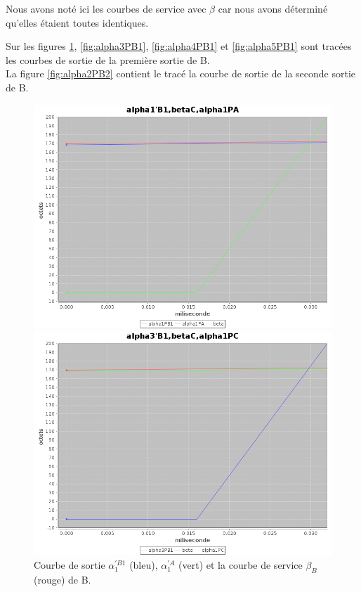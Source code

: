 Nous avons noté ici les courbes de service avec $\beta$ car nous avons déterminé qu'elles étaient toutes identiques.

Sur les figures \ref{fig:alpha1PB1}, \ref{fig:alpha3PB1}, \ref{fig:alpha4PB1} et \ref{fig:alpha5PB1} sont tracées les courbes de sortie de la première sortie de B. \\

La figure \ref{fig:alpha2PB2} contient le tracé la courbe de sortie de la seconde sortie de B.

\begin{figure}[!ht]%
\begin{minipage}{.48\textwidth}%
\centering%
\noindent\includegraphics[width = \textwidth]{./II/images/alpha1PB1.png}%
\caption{\label{fig:alpha1PB1}Courbe de sortie $\alpha_{1}^{'B1}$ (bleu), $\alpha_{1} ^{'A}$ (vert) et la courbe de service $\beta_B$ (rouge) de B.}%
\end{minipage}\hfill%
\begin{minipage}{.48\textwidth}%
\centering%
\noindent\includegraphics[width = \textwidth]{./II/images/alpha3PB1.png}%

\end{minipage}
\end{figure}
